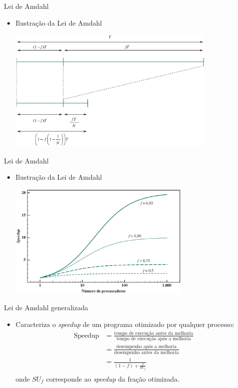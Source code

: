 \begin{slide}{Lei de Amdahl }
	\begin{itemize}
		\item Ilustração da Lei de Amdahl
			\begin{center}
				\includegraphics[width=0.8\textwidth]{figs/amdahl1}
			\end{center}
	\end{itemize}
\end{slide}

\begin{slide}{Lei de Amdahl }
	\begin{itemize}
		\item Ilustração da Lei de Amdahl
			\begin{center}
				\includegraphics[width=0.7\textwidth]{figs/amdahl2}
			\end{center}
	\end{itemize}
\end{slide}


\begin{slide}{Lei de Amdahl generalizada}
\begin{itemize}
   \item Caracteriza o \textit{speedup} de um programa otimizado por qualquer processo:
   \begin{align*}
	   \text{Speedup} &= \frac{\text{tempo de execução antes da melhoria}}{\text{tempo de execução após a melhoria}}\\
              &= \frac{\text{desempenho após a melhoria}}{\text{desempenho antes da melhoria}}\\
              &= \frac{1}{(1-f)+\frac{f}{SU_f}}\\
   \end{align*}
   onde $SU_f$ corresponde ao \textit{speedup} da fração otimizada.
\end{itemize}
\end{slide}

